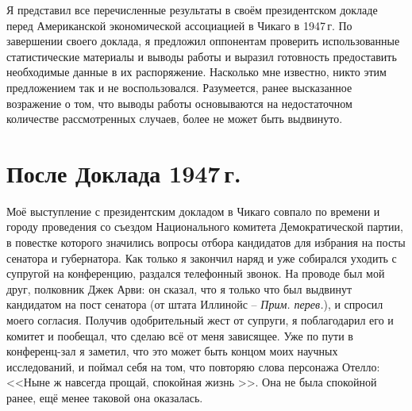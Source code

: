 \documentclass{article}
\begin{document}
Я представил все перечисленные результаты в своём президентском докладе перед Американской экономической ассоциацией в Чикаго в 1947\,г. По завершении своего доклада, я предложил оппонентам проверить использованные статистические материалы и выводы работы и выразил готовность предоставить необходимые данные в их распоряжение. Насколько мне известно, никто этим предложением так и не воспользовался. Разумеется, ранее высказанное возражение о том, что выводы работы основываются на недостаточном количестве рассмотренных случаев, более не может быть выдвинуто.

\section*{После Доклада 1947\,г.}

Моё выступление с президентским докладом в Чикаго совпало по времени и городу проведения со съездом Национального комитета Демократической партии, в повестке которого значились вопросы отбора кандидатов для избрания на посты сенатора и губернатора. Как только я закончил наряд и уже собирался уходить с супругой на конференцию, раздался телефонный звонок. На проводе был мой друг, полковник Джек Арви: он сказал, что я только что был выдвинут кандидатом на пост сенатора (от штата Иллинойс -- \emph{Прим. перев.}), и спросил моего согласия. Получив одобрительный жест от супруги, я поблагодарил его и комитет и пообещал, что сделаю всё от меня зависящее. Уже по пути в конференц-зал я заметил, что это может быть концом моих научных исследований, и поймал себя на том, что повторяю слова персонажа Отелло: <<Ныне ж навсегда прощай, спокойная жизнь%
>>. Она не была спокойной ранее, ещё менее таковой она оказалась.
\end{document}
